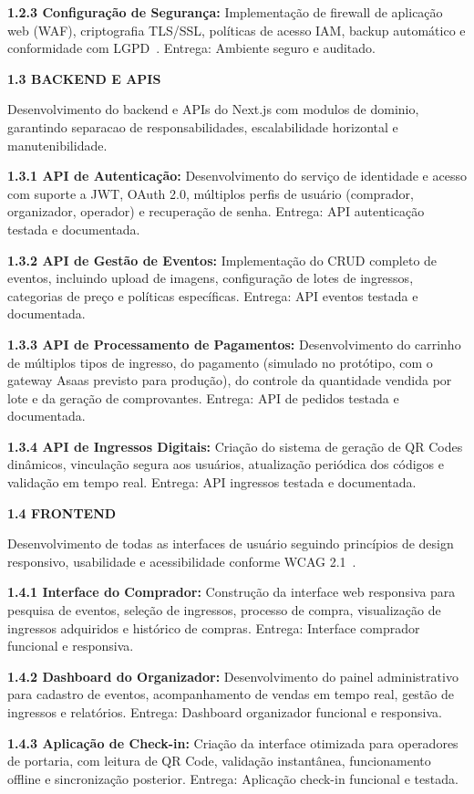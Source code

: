 \textbf{1.2.3 Configuração de Segurança:} Implementação de firewall de aplicação web (WAF), criptografia TLS/SSL, políticas de acesso IAM, backup automático e conformidade com LGPD~\cite{LGPD:2018}. Entrega: Ambiente seguro e auditado.

\textbf{1.3 BACKEND E APIS}

Desenvolvimento do backend e APIs do Next.js com modulos de dominio, garantindo separacao de responsabilidades, escalabilidade horizontal e manutenibilidade.

\textbf{1.3.1 API de Autenticação:} Desenvolvimento do serviço de identidade e acesso com suporte a JWT, OAuth 2.0, múltiplos perfis de usuário (comprador, organizador, operador) e recuperação de senha. Entrega: API autenticação testada e documentada.

\textbf{1.3.2 API de Gestão de Eventos:} Implementação do CRUD completo de eventos, incluindo upload de imagens, configuração de lotes de ingressos, categorias de preço e políticas específicas. Entrega: API eventos testada e documentada.

\textbf{1.3.3 API de Processamento de Pagamentos:} Desenvolvimento do carrinho de múltiplos tipos de ingresso, do pagamento (simulado no protótipo, com o gateway Asaas previsto para produção), do controle da quantidade vendida por lote e da geração de comprovantes. Entrega: API de pedidos testada e documentada.

\textbf{1.3.4 API de Ingressos Digitais:} Criação do sistema de geração de QR Codes dinâmicos, vinculação segura aos usuários, atualização periódica dos códigos e validação em tempo real. Entrega: API ingressos testada e documentada.

\textbf{1.4 FRONTEND}

Desenvolvimento de todas as interfaces de usuário seguindo princípios de design responsivo, usabilidade e acessibilidade conforme WCAG 2.1~\cite{WCAG:2018}.

\textbf{1.4.1 Interface do Comprador:} Construção da interface web responsiva para pesquisa de eventos, seleção de ingressos, processo de compra, visualização de ingressos adquiridos e histórico de compras. Entrega: Interface comprador funcional e responsiva.

\textbf{1.4.2 Dashboard do Organizador:} Desenvolvimento do painel administrativo para cadastro de eventos, acompanhamento de vendas em tempo real, gestão de ingressos e relatórios. Entrega: Dashboard organizador funcional e responsiva.

\textbf{1.4.3 Aplicação de Check-in:} Criação da interface otimizada para operadores de portaria, com leitura de QR Code, validação instantânea, funcionamento offline e sincronização posterior. Entrega: Aplicação check-in funcional e testada.

